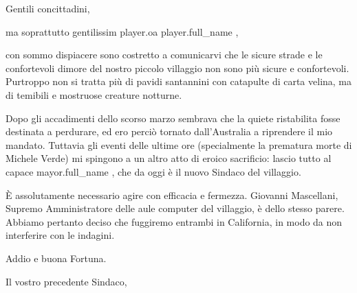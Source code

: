 \documentclass{letter}
\date{17 novembre 2015}
\begin{document}
\begin{letter}{}
\opening{Gentili concittadini,}

ma soprattutto gentilissim{{ player.oa }} {{ player.full_name }},

con sommo dispiacere sono costretto a comunicarvi che le sicure strade e le confortevoli dimore del nostro piccolo villaggio non sono più sicure e confortevoli.
Purtroppo non si tratta più di pavidi santannini con catapulte di carta velina, ma di temibili e mostruose creature notturne.

Dopo gli accadimenti dello scorso marzo sembrava che la quiete ristabilita fosse destinata a perdurare, ed ero perciò tornato dall'Australia a riprendere il mio mandato.
Tuttavia gli eventi delle ultime ore (specialmente la prematura morte di Michele Verde) mi spingono a un altro atto di eroico sacrificio: lascio tutto al capace {{ mayor.full_name }}, che da oggi è il nuovo Sindaco del villaggio.

È assolutamente necessario agire con efficacia e fermezza.
Giovanni Mascellani, Supremo Amministratore delle aule computer del villaggio, è dello stesso parere. Abbiamo pertanto deciso che fuggiremo entrambi in California, in modo da non interferire con le indagini.

Addio e buona Fortuna.

\closing{Il vostro precedente Sindaco,}

\end{letter}
\end{document}
